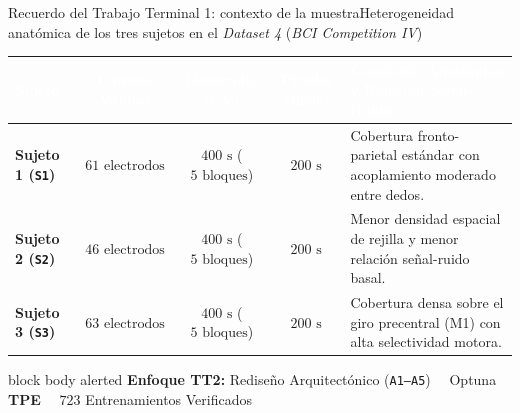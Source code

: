 \begin{frame}{Recuerdo del Trabajo Terminal 1: contexto de la muestra}{Heterogeneidad anat\'omica de los tres sujetos en el \textit{Dataset 4} (\textit{BCI Competition IV}) \cite{miller2008prediction,schalk2004bci2000,Schalk2011}}
  \vfill
  \centering
  {\small
  \renewcommand{\arraystretch}{1.28}
  \setlength{\tabcolsep}{6pt}
  \begin{tabularx}{\textwidth}{@{} l c c c >{\raggedright\arraybackslash}X @{}}
    \toprule
    \rowcolor{ipnDark}
    \textcolor{white}{\textbf{Sujeto}} &
    \textcolor{white}{\textbf{Canales V\'alidos}} &
    \textcolor{white}{\textbf{Desarrollo (CV)}} &
    \textcolor{white}{\textbf{Prueba Oficial}} &
    \textcolor{white}{\textbf{Condici\'on Anat\'omica y Relaci\'on Se\~nal-Ruido}} \\
    \midrule
    \textbf{Sujeto 1 (\texttt{S1})} & $61\text{ electrodos}$ & $400\text{ s}$ ($5\text{ bloques}$) & $200\text{ s}$ & Cobertura fronto-parietal est\'andar con acoplamiento moderado entre dedos. \\
    \rowcolor{rowHighlight}
    \textbf{Sujeto 2 (\texttt{S2})} & $46\text{ electrodos}$ & $400\text{ s}$ ($5\text{ bloques}$) & $200\text{ s}$ & Menor densidad espacial de rejilla y menor relaci\'on se\~nal-ruido basal. \\
    \textbf{Sujeto 3 (\texttt{S3})} & $63\text{ electrodos}$ & $400\text{ s}$ ($5\text{ bloques}$) & $200\text{ s}$ & Cobertura densa sobre el giro precentral (M1) con alta selectividad motora. \\
    \bottomrule
  \end{tabularx}
  }

  \vspace{1.5mm}
  \begin{beamercolorbox}[rounded=true,sep=1.5mm]{block body alerted}
    \scriptsize\centering
    \textbf{Enfoque TT2:} Redise\~no Arquitect\'onico (\texttt{A1--A5}) \ \textbullet\ Optuna \textbf{TPE} \ \textbullet\ $723$ Entrenamientos Verificados
  \end{beamercolorbox}
  \vfill
\end{frame}

